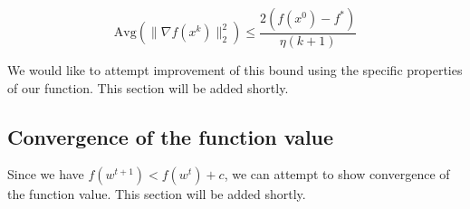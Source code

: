 \documentclass[11pt]{article}
\begin{document}
\begin{equation}
    \textrm{Avg}(\|\nabla f(x^k) \|_2^2) \leq \frac{2(f(x^0) - f^*)}{\eta(k + 1)}
\end{equation}

We would like to attempt improvement of this bound using the specific properties of our function. This section will be added shortly.

\subsection{Convergence of the function value}

Since we have $f(w^{t+1}) < f(w^t) + c$, we can attempt to show convergence of the function value. This section will be added shortly.







\end{document}
